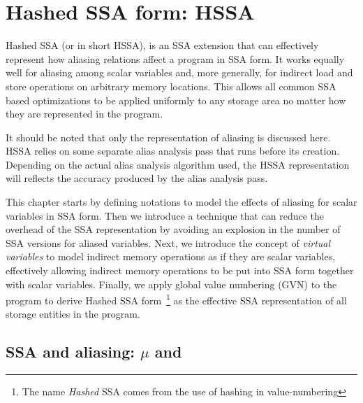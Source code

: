 \chapter{Hashed SSA form: HSSA }
\label{chapter:hssa}


Hashed SSA (or in short HSSA), is an SSA extension that can effectively represent how aliasing relations affect a program in SSA form. It works equally well for aliasing among scalar variables and, more generally, for indirect load and store operations on arbitrary memory locations. This allows all common SSA based optimizations to be applied uniformly to any storage area no matter how they are represented in the program.

It should be noted that only the representation of aliasing is discussed here. HSSA relies on some separate alias analysis pass that runs before its creation. Depending on the actual alias analysis algorithm used, the HSSA representation will reflects the accuracy produced by the alias analysis pass.

This chapter starts by defining notations to model the effects of aliasing for scalar variables in SSA form. Then we introduce a technique that can reduce the overhead of the SSA representation by avoiding an explosion in the number of SSA versions for aliased variables.  Next, we introduce the concept of \emph{virtual variables} to model indirect memory operations as if they are scalar variables, effectively allowing indirect memory operations to be put into SSA form together with scalar variables.  
Finally, we apply global value numbering (GVN) to the program to derive Hashed SSA form~\footnote{The name \emph{Hashed} SSA comes from the use of hashing in value-numbering} as the effective SSA representation of all storage entities in the program. 

\section{SSA and aliasing: $\mu$ and \chifuns}


